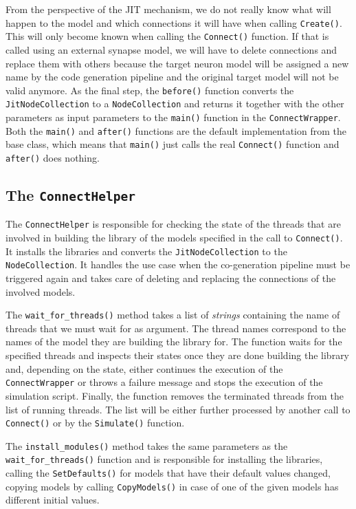 From the perspective of the JIT mechanism, we do not really know what will happen to the model and which connections it will have when calling \texttt{Create()}. This will only become known when calling the \texttt{Connect()} function. If that is called using an external synapse model, we will have to delete connections and replace them with others because the target neuron model will be assigned a new name by the code generation pipeline and the original target model will not be valid anymore. As the final step, the \texttt{before()} function converts the \texttt{JitNodeCollection} to a \texttt{NodeCollection} and returns it together with the other parameters as input parameters to the \texttt{main()} function in the \texttt{ConnectWrapper}. Both the \texttt{main()} and \texttt{after()} functions are the default implementation from the base class, which means that \texttt{main()} just calls the real \texttt{Connect()} function and \texttt{after()} does nothing.

\subsection{The \texttt{ConnectHelper}}

The \texttt{ConnectHelper} is responsible for checking the state of the threads that are involved in building the library of the models specified in the call to \texttt{Connect()}. It installs the libraries and converts the \texttt{JitNodeCollection} to the \texttt{NodeCollection}. It handles the use case when the co-generation pipeline must be triggered again and takes care of deleting and replacing the connections of the involved models.

The \texttt{wait\_for\_threads()} method takes a list of \emph{strings} containing the name of threads that we must wait for as argument. The thread names correspond to the names of the model they are building the library for. The function waits for the specified threads and inspects their states once they are done building the library and, depending on the state, either continues the execution of the \texttt{ConnectWrapper} or throws a failure message and stops the execution of the simulation script. Finally, the function removes the terminated threads from the list of running threads. The list will be either further processed by another call to \texttt{Connect()} or by the \texttt{Simulate()} function.

The \texttt{install\_modules()} method takes the same parameters as the  \texttt{wait\_for\_threads()} function and is responsible for installing the libraries, calling the \texttt{SetDefaults()} for models that have their default values changed, copying models by calling \texttt{CopyModels()} in case of one of the given models has different initial values.

